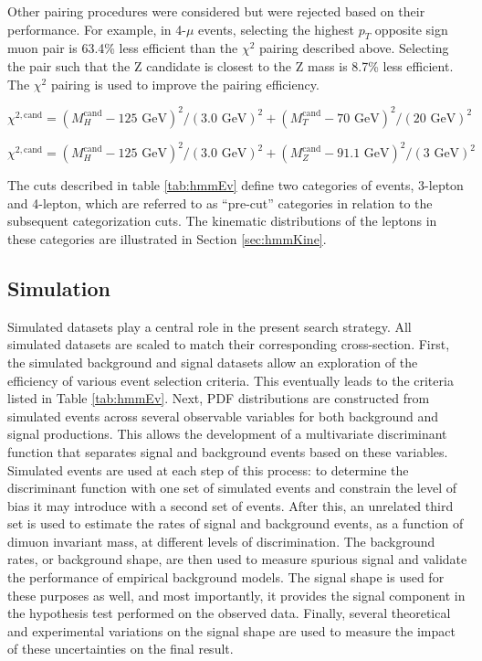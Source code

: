 Other pairing procedures were considered but were rejected based on their performance. For example, in 4-$\mu$ events, selecting the highest $p_T$ opposite sign muon pair is 63.4\% less efficient than the $\chi^2$ pairing described above. Selecting the pair such that the Z candidate is closest to the Z mass is 8.7\% less efficient. The $\chi^2$ pairing is used to improve the pairing efficiency.

\begin{equation}
  \label{eq:hmmWhPairing}
  \chi^{2,\text{cand}} = (M_H^\text{cand}-125\text{ GeV})^2/(3.0\text{ GeV})^2 + (M_T^\text{cand}-70\text{ GeV} )^2/(20\text{ GeV})^2
\end{equation}

\begin{equation}
  \label{eq:hmmZhPairing}
  \chi^{2,\text{cand}} = (M_H^\text{cand}-125\text{ GeV})^2/(3.0\text{ GeV})^2 + (M_Z^\text{cand}-91.1\text{ GeV} )^2/(3\text{ GeV})^2
\end{equation}

The cuts described in table \ref{tab:hmmEv} define two categories of events, 3-lepton and 4-lepton, which are referred to as ``pre-cut'' categories in relation to the subsequent categorization cuts.
The kinematic distributions of the leptons in these categories are illustrated in Section \ref{sec:hmmKine}.


\subsection{Simulation}\label{sec:hmmSim}

Simulated datasets play a central role in the present search strategy.
All simulated datasets are scaled to match their corresponding cross-section.
First, the simulated background and signal datasets allow an exploration of the efficiency of various event selection criteria.
This eventually leads to the criteria listed in Table \ref{tab:hmmEv}.
Next, PDF distributions are constructed from simulated events across several observable variables for both background and signal productions.
This allows the development of a multivariate discriminant function that separates signal and background events based on these variables.
Simulated events are used at each step of this process: to determine the discriminant function with one set of simulated events and constrain the level of bias it may introduce with a second set of events.
After this, an unrelated third set is used to estimate the rates of signal and background events, as a function of dimuon invariant mass, at different levels of discrimination.
The background rates, or background shape, are then used to measure spurious signal and validate the performance of empirical background models.
The signal shape is used for these purposes as well, and most importantly, it provides the signal component in the hypothesis test performed on the observed data.
Finally, several theoretical and experimental variations on the signal shape are used to measure the impact of these uncertainties on the final result.

